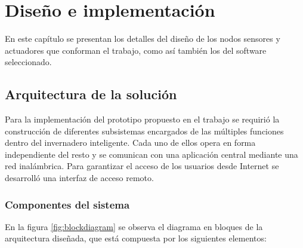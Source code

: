 

\chapter{Diseño e implementación} %

\label{Chapter3} %



En este capítulo se presentan los detalles del diseño de los nodos sensores y actuadores que conforman el trabajo, como así también los del software seleccionado.

\section{Arquitectura de la solución}
\label{sec:Arquitectura de la solución}


Para la implementación del prototipo propuesto en el trabajo se requirió la construcción de diferentes subsistemas encargados de las múltiples funciones dentro del invernadero inteligente. Cada uno de ellos opera en forma independiente del resto y se comunican con una aplicación central mediante una red inalámbrica. 
Para garantizar el acceso de los usuarios desde Internet se desarrolló una interfaz de acceso remoto.





\subsection{Componentes del sistema}
\label{Componentes del sistema}

En la figura \ref{fig:blockdiagram} se observa el diagrama en bloques de la arquitectura diseñada, que está compuesta por los siguientes elementos: 

